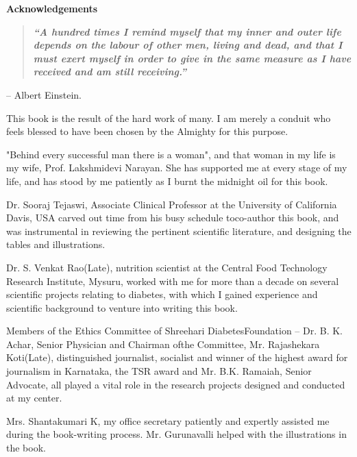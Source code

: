 \thispagestyle{empty}


\begin{center}
\Huge\textbf{Acknowledgements}
\end{center}

\vskip 20pt

{{\setlength{\parskip}{.5em}

\begin{quote}
\textbf{\textit{“A hundred times I remind myself that my inner and outer life depends on the labour of other men, living and dead, and that I must exert myself in order to give in the same measure as I have received and am still receiving.”}}
\end{quote}
\hfill{– Albert Einstein.}

This book is the result of the hard work of many. I am merely a conduit who feels blessed to have been chosen by the Almighty for this purpose.

"Behind every successful man there is a woman", and that woman in my life is my wife, Prof. Lakshmidevi Narayan. She has supported me at every stage of my life, and has stood by me patiently as I burnt the midnight oil for this book.

Dr. Sooraj Tejaswi, Associate Clinical Professor at the University of California Davis, USA carved out time from his busy schedule to\break co-author this book, and was instrumental in reviewing the pertinent scientific literature, and designing the tables and illustrations.

Dr. S. Venkat Rao(Late), nutrition scientist at the Central Food Technology Research Institute, Mysuru, worked with me for more than a decade on several scientific projects relating to diabetes, with which I gained experience and scientific background to venture into writing this book.

Members of the Ethics Committee of Shreehari Diabetes\break Foundation – Dr. B. K. Achar, Senior Physician and Chairman of\break the Committee, Mr. Rajashekara Koti(Late), distinguished journalist, socialist and winner of the highest award for journalism in Karnataka, the TSR award and Mr. B.K. Ramaiah, Senior Advocate, all played a vital role in the research projects designed and conducted at my center.}

{\setlength{\parskip}{.2em}
Mrs. Shantakumari K, my office secretary patiently and expertly assisted me during the book-writing process. Mr. Gurunavalli helped with the illustrations in the book.

}}
